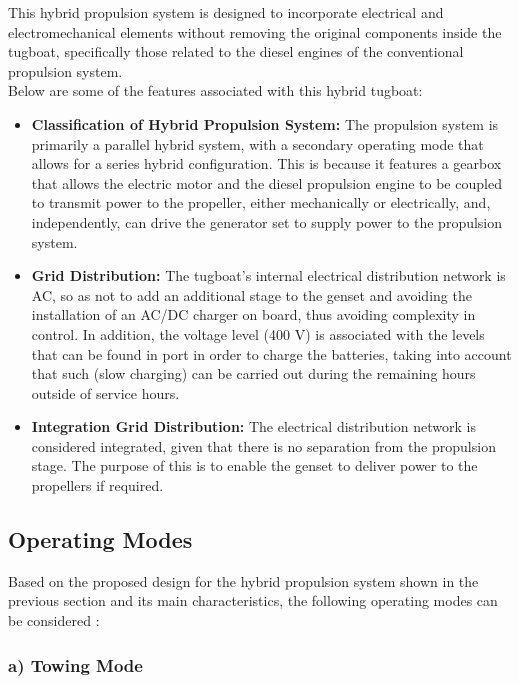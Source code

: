 This hybrid propulsion system is designed to incorporate electrical and electromechanical elements without removing the original components inside the tugboat, specifically those related to the diesel engines of the conventional propulsion system.\\

Below are some of the features associated with this hybrid tugboat:

\begin{itemize}
	\item \textbf{Classification of Hybrid Propulsion System:} The propulsion system is primarily a parallel hybrid system, with a secondary operating mode that allows for a series hybrid configuration. This is because it features a gearbox that allows the electric motor and the diesel propulsion engine to be coupled to transmit power to the propeller, either mechanically or electrically, and, independently, can drive the generator set to supply power to the propulsion system.
	\item \textbf{Grid Distribution:} The tugboat's internal electrical distribution network is AC, so as not to add an additional stage to the genset and avoiding the installation of an AC/DC charger on board, thus avoiding complexity in control. In addition, the voltage level (400 V) is associated with the levels that can be found in port in order to charge the batteries, taking into account that such (slow charging) can be carried out during the remaining hours outside of service hours.
	\item \textbf{Integration Grid Distribution:} The electrical distribution network is considered integrated, given that there is no separation from the propulsion stage. The purpose of this is to enable the genset to deliver power to the propellers if required.
\end{itemize}

\subsection{Operating Modes}

Based on the proposed design for the hybrid propulsion system shown in the previous section and its main characteristics, the following operating modes can be considered \cite{DAMEN}:

\subsubsection{a) Towing Mode}

